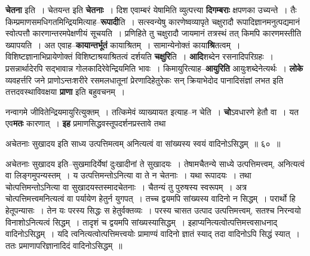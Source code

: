 \documentclass[article,12pt,a4paper]{memoir}
\begin{document}
	  \pstart \textbf{चेतना} इति । चेतयन्त इति \textbf{चेतनाः} । दिश एवाम्बरं येषामिति व्युत्पत्त्या \textbf{दिगम्बराः} क्षपणका उच्यन्ते । तैः किम्प्रमाणसमधिगतमिन्द्रियमित्याह--\textbf{रूपादी}ति । सत्स्वन्येषु कारणेष्वव्यापृते चक्षुरादौ रूपादिज्ञानमनुत्पद्यमानं स्वोत्पत्तौ कारणा\leavevmode{}न्तरमपेक्षणीयं सूचयति । प्रणिहिते तु चक्षुरादौ जायमानं तत्रस्थं तत् किमपि कारणमस्तीति ख्यापयति । अत एवाह--\textbf{कायान्तर्भूतं} कायाश्रितम् । सामान्येनोक्तं काया\textbf{श्रि}तत्वम् । विशिष्टज्ञानाभिप्रायेणोक्तं विशिष्टाश्रयाश्रितत्वं दर्शयति \textbf{चक्षुरि}ति । \textbf{आदि}शब्देन रसनादिपरिग्रहः । प्रसन्नार्थादेरपि सद्भावान्न गोलकादिरेवेन्द्रियमिति भावः । किमायुरित्याह--\textbf{आयुरिति} आयुःशब्देनेत्यर्थः । \textbf{लोके} व्यवहर्त्तरि जने प्राणोऽन्तःशरीरे रसमलधातूनां प्रेरणादिहेतुरेकः सन् क्रियाभेदोद  पानादिसंज्ञां लभत इति तत्तदवस्थाविवक्षया \textbf{प्राणा} इति बहुवचनम् ।
	\pend
      

	  \pstart नन्वागमे जीवितेन्द्रियमायुरित्युक्तम् । तत्किमेवं व्याख्यायत इत्याह--न चेति । \textbf{चो}ऽवधारणे हेतौ वा । यत एव\textbf{मतः} कारणात् । \textbf{इह} प्रमाणसिद्धवस्तूपदर्शनप्रस्तावे तथा  \leavevmode{} 
	  
	अचेतनाः सुखादय इति साध्य उत्पत्तिमत्वम् अनित्यत्वं वा सांख्यस्य स्वयं वादिनोऽसिद्धम् ॥ ६० ॥ 
	  
	अचेतनाः सुखादय इति--सुखमादिर्येषां दुःखादीनां ते सुखादयः । तेषामचैतन्ये साध्ये उत्पत्तिमत्त्वम्, अनित्यत्वं वा लिङ्गमुपन्यस्तम् । य उत्पत्तिमन्तोऽनित्या वा ते न चेतनाः । यथा रूपादयः । तथा चोत्पत्तिमन्तोऽनित्या वा सुखादयस्तस्मादचेतनाः । चैतन्यं तु पुरुषस्य स्वरूपम् । अत्र चोत्पत्तिमत्त्वमनित्यत्वं वा पर्यायेण हेतुर्न युगपत् । तच्च द्वयमपि सांख्यस्य वादिनो न सिद्धम् । परार्थो हि हेतूपन्यासः । तेन यः परस्य सिद्धः स हेतुर्वक्तव्यः । परस्य चासत उत्पाद उत्पत्तिमत्त्वम्, सतश्च निरन्वयो विनाशोऽनित्यत्वं सिद्धम् । तादृशं च द्वयमपि सांख्यस्यासिद्धम् । इहाप्यनित्यत्वोत्पत्तिमत्त्वसाधनाद् वादिनोऽसिद्धम् । यदि त्वनित्यत्वोत्पत्तिमत्त्वयोः प्रामाण्यं वादिनो ज्ञातं स्याद् तदा वादिनोऽपि सिद्धं स्यात् । ततः प्रमाणापरिज्ञानादिदं वादिनोऽसिद्धम् ॥  
	  
\end{document}
